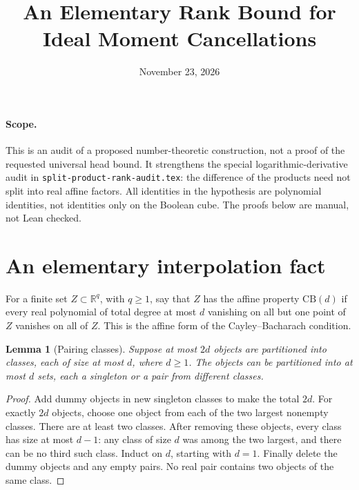 \documentclass[11pt]{article}
\title{An Elementary Rank Bound for Ideal Moment Cancellations}
\author{}
\date{November 23, 2026}
\newtheorem{lemma}[theorem]{Lemma}
\begin{document}
\maketitle

\paragraph{Scope.}
This is an audit of a proposed number-theoretic construction, not a proof
of the requested universal head bound. It strengthens the special
logarithmic-derivative audit in \texttt{split-product-rank-audit.tex}:
the difference of the products need not split into real affine factors.
All identities in the hypothesis are polynomial identities, not identities
only on the Boolean cube. The proofs below are manual, not Lean checked.

\section{An elementary interpolation fact}

For a finite set $Z\subset\mathbb R^q$, with $q\ge1$, say that $Z$ has the affine
property $\mathrm{CB}(d)$ if every real polynomial of total degree at
most $d$ vanishing on all but one point of $Z$ vanishes on all of $Z$.
This is the affine form of the Cayley--Bacharach condition.

\begin{lemma}[Pairing classes]
Suppose at most $2d$ objects are partitioned into classes, each of size
at most $d$, where $d\ge1$. The objects can be partitioned into at most
$d$ sets, each a singleton or a pair from different classes.
\end{lemma}
\begin{proof}
Add dummy objects in new singleton classes to make the total $2d$.
For exactly $2d$ objects, choose one object from each of the two largest
nonempty classes. There are at least two classes. After removing these
objects, every class has size at most $d-1$: any class of size $d$ was
among the two largest, and there can be no third such class. Induct on
$d$, starting with $d=1$. Finally delete the dummy objects and any
empty pairs. No real pair contains two objects of the same class.
\end{proof}
\end{document}
